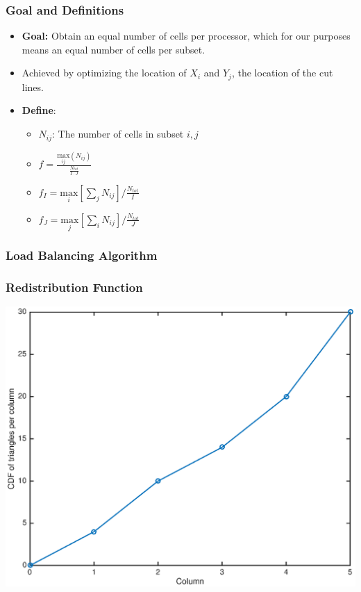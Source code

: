 \documentclass[compress]{beamer}
\begin{document}
\begin{frame}[t]\frametitle{ Goal and Definitions}
	\begin{block}{}
	
		\begin{itemize}
			\item \textbf{Goal:} Obtain an equal number of cells per processor, which for our purposes means an equal number of cells per subset.
			\item Achieved by optimizing the location of $X_i$ and $Y_j$, the location of the cut lines.
			\item \textbf{Define}:
			\begin{itemize}
			\item $N_{ij}$: The number of cells  in subset ${i,j}$
			\item $f =\frac{\underset{ij}{\text{max}}(N_{ij})}{\frac{N_{tot}}{I\cdot J}}$
			\item $f_I = \underset{i}{\text{max}}[\sum_{j} N_{ij}]/\frac{N_{tot}}{I}$
			\item $f_J = \underset{j}{\text{max}}[\sum_{i} N_{ij}]/\frac{N_{tot}}{J}$
			\end{itemize}
		\end{itemize}
	\end{block}
\end{frame}

\begin{frame}[t]\frametitle{Load Balancing Algorithm}
\vspace{-0.5 cm}
\begin{block}{}

\end{block}
\end{frame}

\begin{frame}[t]\frametitle{Redistribution Function}
\centering
\includegraphics[scale = 0.5]{figures/before_redistribute.eps}
\end{frame}
\end{document}
